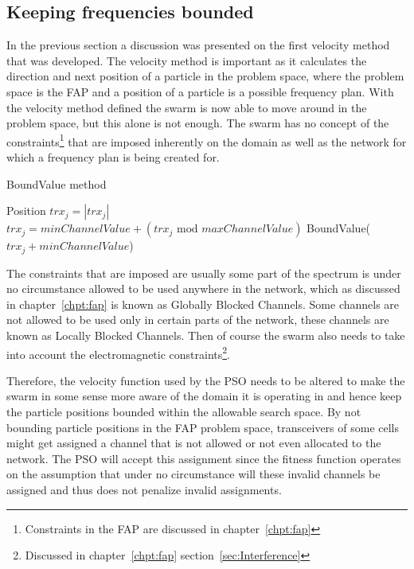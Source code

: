 \subsection{Keeping frequencies bounded}
In the previous section a discussion was presented on the first velocity method that was developed. The velocity method is important as it calculates the direction and next position of a particle in the problem space, where the problem space is the FAP and a position of a particle is a possible frequency plan. With the velocity method defined the swarm is now able to move around in the problem space, but this alone is not enough. The swarm has no concept of the constraints\footnote{Constraints in the FAP are discussed in chapter~\ref{chpt:fap}} that are imposed inherently on the domain as well as the network for which a frequency plan is being created for.
\begin{algorithm}
\caption{BoundValue method}
\label{alg:boundvalue}
\begin{algorithmic}[1]
	\REQUIRE Position
			\STATE $trx_j = \left|trx_j\right|$
				\STATE $trx_j = minChannelValue + (\text{$trx_j$ mod $maxChannelValue$})$
			\ELSE 
					\STATE BoundValue($trx_j + minChannelValue$)
				\ENDIF
			\ENDIF
		\ENDFOR
	\ENDFOR
\end{algorithmic}
\end{algorithm}
The constraints that are imposed are usually some part of the spectrum is under no circumstance allowed to be used anywhere in the network, which as discussed in chapter~\ref{chpt:fap} is known as Globally Blocked Channels. Some channels are not allowed to be used only in certain parts of the network, these channels are known as Locally Blocked Channels. Then of course the swarm also needs to take into account the electromagnetic constraints\footnote{Discussed in chapter~\ref{chpt:fap} section~\ref{sec:Interference}}.

Therefore, the velocity function used by the PSO needs to be altered to make the swarm in some sense more aware of the domain it is operating in and hence keep the particle positions bounded within the allowable search space. By not bounding particle positions in the FAP problem space, transceivers of some cells might get assigned a channel that is not allowed or not even allocated to the network. The PSO will accept this assignment since the fitness function operates on the assumption that under no circumstance will these invalid channels be assigned and thus does not penalize invalid assignments.

